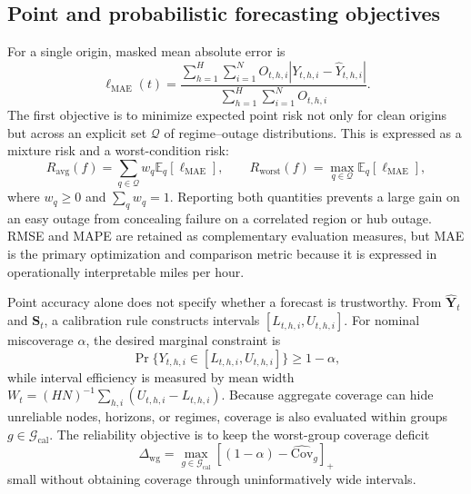 \documentclass[pdflatex,sn-mathphys-num]{sn-jnl}
\begin{document}
\subsection{Point and probabilistic forecasting objectives}
For a single origin, masked mean absolute error is
\begin{equation}
 \ell_{\mathrm{MAE}}(t)=
 \frac{\sum_{h=1}^{H}\sum_{i=1}^{N}O_{t,h,i}
 |Y_{t,h,i}-\widehat{Y}_{t,h,i}|}
 {\sum_{h=1}^{H}\sum_{i=1}^{N}O_{t,h,i}}.
 \label{eq:origin-mae}
\end{equation}
The first objective is to minimize expected point risk not only for clean
origins but across an explicit set $\mathcal{Q}$ of regime--outage
distributions. This is expressed as a mixture risk and a worst-condition risk:
\begin{equation}
 R_{\mathrm{avg}}(f)=\sum_{q\in\mathcal{Q}}w_q
 \mathbb{E}_{q}[\ell_{\mathrm{MAE}}],
 \qquad
 R_{\mathrm{worst}}(f)=\max_{q\in\mathcal{Q}}
 \mathbb{E}_{q}[\ell_{\mathrm{MAE}}],
 \label{eq:robust-risks}
\end{equation}
where $w_q\geq0$ and $\sum_qw_q=1$. Reporting both quantities prevents a large
gain on an easy outage from concealing failure on a correlated region or hub
outage. RMSE and MAPE are retained as complementary evaluation measures, but
MAE is the primary optimization and comparison metric because it is expressed
in operationally interpretable miles per hour.

Point accuracy alone does not specify whether a forecast is trustworthy. From
$\widehat{\mathbf{Y}}_t$ and $\mathbf{S}_t$, a calibration rule constructs
intervals $[L_{t,h,i},U_{t,h,i}]$. For nominal miscoverage $\alpha$, the desired
marginal constraint is
\begin{equation}
 \Pr\{Y_{t,h,i}\in[L_{t,h,i},U_{t,h,i}]\}\geq1-\alpha,
 \label{eq:coverage-target}
\end{equation}
while interval efficiency is measured by mean width
$W_t=(HN)^{-1}\sum_{h,i}(U_{t,h,i}-L_{t,h,i})$. Because aggregate coverage can
hide unreliable nodes, horizons, or regimes, coverage is also evaluated within
groups $g\in\mathcal{G}_{\mathrm{cal}}$. The reliability objective is to keep
the worst-group coverage deficit
\begin{equation}
 \Delta_{\mathrm{wg}}=
 \max_{g\in\mathcal{G}_{\mathrm{cal}}}
 \left[(1-\alpha)-\widehat{\mathrm{Cov}}_g\right]_{+}
 \label{eq:worst-group-gap}
\end{equation}
small without obtaining coverage through uninformatively wide intervals.
\end{document}
